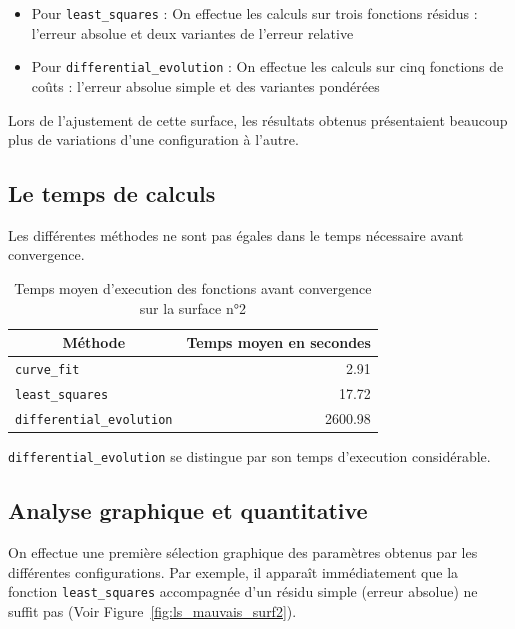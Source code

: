 \documentclass[11pt, a4paper, openany]{report}
\begin{document}
\begin{itemize}
  \item Pour \texttt{least\_squares} : On effectue les calculs sur trois 
    fonctions résidus : l'erreur absolue et deux variantes de l'erreur relative 
  \item Pour \texttt{differential\_evolution} : On effectue les calculs sur cinq 
    fonctions de coûts : l'erreur absolue simple et des variantes pondérées
\end{itemize}

\noindent Lors de l'ajustement de cette surface, les résultats obtenus présentaient 
beaucoup plus de variations d'une configuration à l'autre.

\subsection{Le temps de calculs}

\noindent Les différentes méthodes ne sont pas égales dans le temps nécessaire
avant convergence.

\begin{table}[H]
  \caption{Temps moyen d'execution des fonctions avant convergence sur la surface n°2}\label{tab:}
  \begin{center}
    \begin{tabular}[c]{lr}
      \hline
      \multicolumn{1}{c}{Méthode} & 
      \multicolumn{1}{c}{Temps moyen en secondes} \\
      \hline
      \texttt{curve\_fit} & 2.91 \\
      \texttt{least\_squares} & 17.72\\
      \texttt{differential\_evolution} & 2600.98 \\
      \hline
    \end{tabular}
  \end{center}
\end{table}

\noindent \texttt{differential\_evolution} se distingue par son temps 
d'execution considérable.

\subsection{Analyse graphique et quantitative\label{sec:fit-surf2}}

\noindent On effectue une première sélection graphique des paramètres obtenus 
par les différentes configurations. Par exemple, il apparaît immédiatement
que la fonction \texttt{least\_squares} accompagnée d'un résidu simple (erreur
absolue) ne suffit pas (Voir Figure~\ref{fig:ls_mauvais_surf2}).\\
\end{document}
